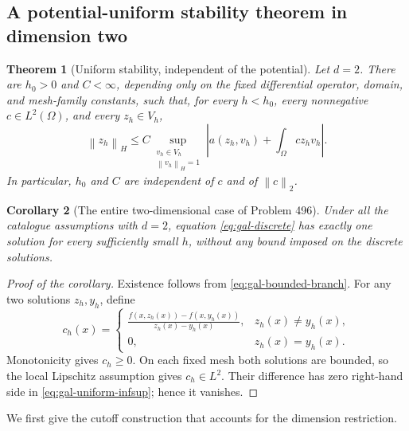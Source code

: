 \documentclass[11pt,a4paper]{article}
\newcommand{\norm}[1]{\left\lVert#1\right\rVert}
\newcommand{\abs}[1]{\left\lvert#1\right\rvert}
\newtheorem{theorem}{Theorem}[section]
\newtheorem{corollary}[theorem]{Corollary}
\theoremstyle{definition}
\theoremstyle{remark}
\numberwithin{equation}{section}
\begin{document}
\subsection{A potential-uniform stability theorem in dimension two}

\begin{theorem}[Uniform stability, independent of the potential]\label{thm:gal-2d-stability}
Let $d=2$. There are $h_0>0$ and $C<\infty$, depending only on the fixed differential operator, domain, and mesh-family constants, such that, for every $h<h_0$, every nonnegative $c\in L^2(\Omega)$, and every $z_h\in V_h$,
\begin{equation}\label{eq:gal-uniform-infsup}
 \norm{z_h}_H\le C
 \sup_{\substack{v_h\in V_h\\\norm{v_h}_H=1}}
 \abs{a(z_h,v_h)+\int_\Omega c z_hv_h}.
\end{equation}
In particular, $h_0$ and $C$ are independent of $c$ and of $\norm{c}_2$.
\end{theorem}

\begin{corollary}[The entire two-dimensional case of Problem 496]\label{cor:gal-2d}
Under all the catalogue assumptions with $d=2$, equation \eqref{eq:gal-discrete} has exactly one solution for every sufficiently small $h$, without any bound imposed on the discrete solutions.
\end{corollary}
\begin{proof}[Proof of the corollary]
Existence follows from \eqref{eq:gal-bounded-branch}. For any two solutions $z_h,y_h$, define
\[
 c_h(x)=\begin{cases}
 \displaystyle\frac{f(x,z_h(x))-f(x,y_h(x))}{z_h(x)-y_h(x)},
       &z_h(x)\ne y_h(x),\\[5pt]
 0,&z_h(x)=y_h(x).
 \end{cases}
\]
Monotonicity gives $c_h\ge0$. On each fixed mesh both solutions are bounded, so the local Lipschitz assumption gives $c_h\in L^2$. Their difference has zero right-hand side in \eqref{eq:gal-uniform-infsup}; hence it vanishes.
\end{proof}

We first give the cutoff construction that accounts for the dimension restriction.
\end{document}
